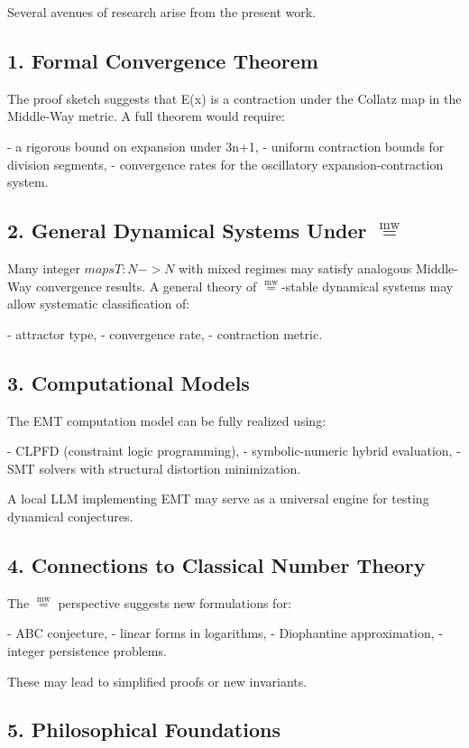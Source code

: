 \documentclass[11pt]{article}
\newcommand{\mweq}{\mathrel{\overset{\mathrm{mw}}{=}}}
\theoremstyle{definition}
\theoremstyle{remark}
\begin{document}
Several avenues of research arise from the present work.

\subsection{1. Formal Convergence Theorem}

The proof sketch suggests that E(x) is a contraction under the Collatz
map in the Middle-Way metric.  
A full theorem would require:

- a rigorous bound on expansion under 3n+1,
- uniform contraction bounds for division segments,
- convergence rates for the oscillatory expansion-contraction system.

\subsection{2. General Dynamical Systems Under $\mweq$}

Many integer $maps T: N -> N$ with mixed regimes may satisfy analogous
Middle-Way convergence results.  
A general theory of $\mweq$-stable dynamical systems may allow systematic
classification of:

- attractor type,
- convergence rate,
- contraction metric.

\subsection{3. Computational Models}

The EMT computation model can be fully realized using:

- CLPFD (constraint logic programming),
- symbolic-numeric hybrid evaluation,
- SMT solvers with structural distortion minimization.

A local LLM implementing EMT may serve as a universal engine for
testing dynamical conjectures.

\subsection{4. Connections to Classical Number Theory}

The $\mweq$ perspective suggests new formulations for:

- ABC conjecture,
- linear forms in logarithms,
- Diophantine approximation,
- integer persistence problems.

These may lead to simplified proofs or new invariants.

\subsection{5. Philosophical Foundations}
\end{document}
